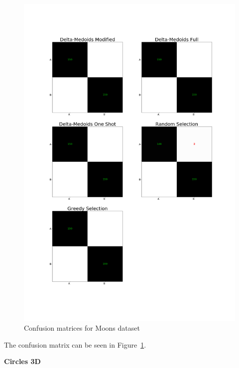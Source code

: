 \documentclass[thesis=B,english]{FITthesis}[2012/10/20]
\begin{document}
\begin{figure}[t]
   \includegraphics[width=\linewidth]{img/exp1_moons.png}
  \caption{Confusion matrices for Moons dataset}
  \label{img:exp1_moons}
\end{figure}
\noindent The confusion matrix can be seen in Figure~\ref{img:exp1_moons}.
\medskip

\textbf{Circles 3D}
\end{document}
